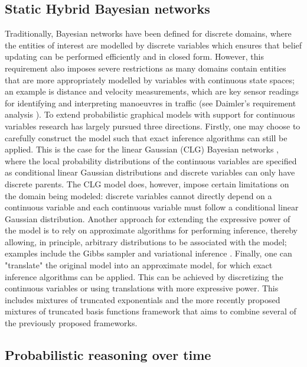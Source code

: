 \subsection{Static Hybrid Bayesian networks}\label{SubSection:HybridBNs}
Traditionally, Bayesian networks have been defined for discrete domains, where the entities of interest are modelled by discrete variables which ensures that belief updating can be performed efficiently and in closed form. However, this requirement also imposes severe restrictions as many domains contain entities that are more appropriately modelled by variables with continuous state spaces; an example is distance and velocity measurements, which are key sensor readings for identifying and interpreting manoeuvres in traffic (see Daimler's requirement analysis \cite{Fer14}). To extend probabilistic graphical models with support for continuous variables research has largely pursued three directions. Firstly, one may choose to carefully construct the model such that exact inference algorithms can still be applied. This is the case for the linear Gaussian (CLG) Bayesian networks \cite{Lauritzen1992,LauritzenJensen2001}, where the local probability distributions of the continuous variables are specified as conditional linear Gaussian distributions and discrete variables can only have discrete parents. The CLG model does, however, impose certain limitations on the domain being modeled: discrete variables cannot directly depend on a continuous variable and each continuous variable must follow a conditional linear Gaussian distribution. Another approach for extending the expressive power of the model is to rely on approximate algorithms for performing inference, thereby allowing, in principle, arbitrary distributions to be associated with the model; examples include the Gibbs sampler \cite{Geman1984, hrycej1990gibbs} and variational inference \cite{Jordan1999}. Finally, one can "translate" the original model into an approximate model, for which exact inference algorithms can be applied. This can be achieved by discretizing the continuous variables \cite{KozlovKollerUAI97} or using translations with more expressive power. This includes mixtures of truncated exponentials \cite{Moral2001} and the more recently proposed mixtures of truncated basis functions framework \cite{Langseth12} that aims to combine several of the previously proposed frameworks.

\subsection{Probabilistic reasoning over time}\label{SubSection:DBNs}

